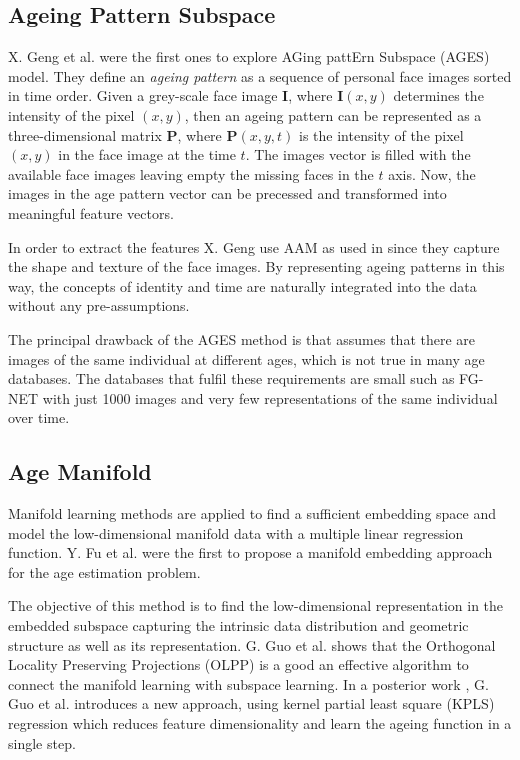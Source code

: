 \subsection{Ageing Pattern Subspace}

X. Geng et al. \cite{4359348, Geng:2006:LFA:1180639.1180711} were the first ones to explore AGing pattErn Subspace (AGES) model. They define an \textit{ageing pattern} as a sequence of personal face images sorted in time order. Given a grey-scale face image $\textbf{I}$, where $\textbf{I}(x,y)$ determines the intensity of the pixel $(x,y)$, then an ageing pattern can be represented as a three-dimensional matrix $\textbf{P}$, where $\textbf{P}(x,y,t)$ is the intensity of the pixel $(x,y)$ in the face image at the time $t$. The images vector is filled with the available face images leaving empty the missing faces in the $t$ axis. Now, the images in the age pattern vector can be precessed and transformed into meaningful feature vectors.

In order to extract the features X. Geng use AAM as used in \cite{791208} since they capture the shape and texture of the face images. By representing ageing patterns in this way, the concepts of identity and time are naturally integrated into the data without any pre-assumptions.

The principal drawback of the AGES method is that assumes that there are images of the same individual at different ages, which is not true in many age databases. The databases that fulfil these requirements are small such as FG-NET \cite{FGNET} with just 1000 images and very few representations of the same individual over time.

\subsection{Age Manifold}
 
Manifold learning methods are applied to find a sufficient embedding space and model the low-dimensional manifold data with a multiple linear regression function. Y. Fu et al. \cite{4523958, 4284917} were the first to propose a manifold embedding approach for the age estimation problem. 

The objective of this method is to find the low-dimensional representation in the embedded subspace capturing the intrinsic data distribution and geometric structure as well as its representation. G. Guo et al. \cite{Guo:2008:IHA:2319085.2321608} \cite{4531189} shows that the Orthogonal Locality Preserving Projections (OLPP) \cite{CHHZ06}  is a good an effective algorithm  to connect the manifold learning with subspace learning. In a posterior work \cite{5995404}, G. Guo et al. introduces a new approach, using kernel partial least square (KPLS) regression which reduces feature dimensionality and learn the ageing function in a single step.

